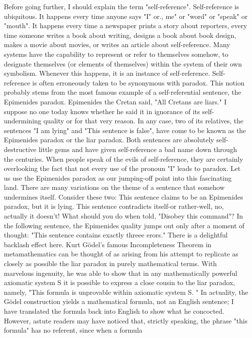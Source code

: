 Before going further, I should explain the term "self-reference". Self-reference is ubiquitous. It happens every time anyone says "I" or., me" or "word" or "speak" or "mouth". It happens every time a newspaper prints a story about reporters, every time someone writes a book about writing, designs a book about book design, makes a movie about movies, or writes an article about self-reference. Many systems have the capability to represent or refer to themselves somehow, to designate themselves (or elements of themselves) within the system of their own symbolism. Whenever this happens, it is an instance of self-reference. Self-reference is often erroneously taken to be synonymous with paradox. This notion probably stems from the most famous example of a self-referential sentence, the Epimenides paradox. Epimenides the Cretan said, "All Cretans are liars." I suppose no one today knows whether he said it in ignorance of its self-undermining quality or for that very reason. In any case, two of its relatives, the sentences "I am lying" and "This sentence is false", have come to be known as the Epimenides paradox or the liar paradox. Both sentences are absolutely self-destructive little gems and have given self-reference a bad name down through the centuries. When people speak of the evils of self-reference, they are certainly overlooking the fact that not every use of the pronoun "I" leads to paradox. 
\separator
Let us use the Epimenides paradox as our jumping-off point into this fascinating land. There are many variations on the theme of a sentence that somehow undermines itself. Consider these two: 
This sentence claims to be an Epimenides paradox, but it is lying. This sentence contradicts itself-or rather-well, no, actually it doesn't! 
What should you do when told, "Disobey this command"? In the following sentence, the Epimenides quality jumps out only after a moment of thought: "This sentence contains exactly threee erors." There is a delightful backlash effect here. Kurt Gödel’s famous Incompleteness Theorem in metamathematics can be thought of as arising from his attempt to replicate as closely as possible the liar paradox in purely mathematical terms. With marvelous ingenuity, he was able to show that in any mathematically powerful axiomatic system S it is possible to express a close cousin to the liar paradox, namely, "This formula is unprovable within axiomatic system S. " In actuality, the Gödel construction yields a mathematical formula, not an English sentence; I have translated the formula back into English to show what he concocted. However, astute readers may have noticed that, strictly speaking, the phrase "this formula" has no referent, since when a formula 



